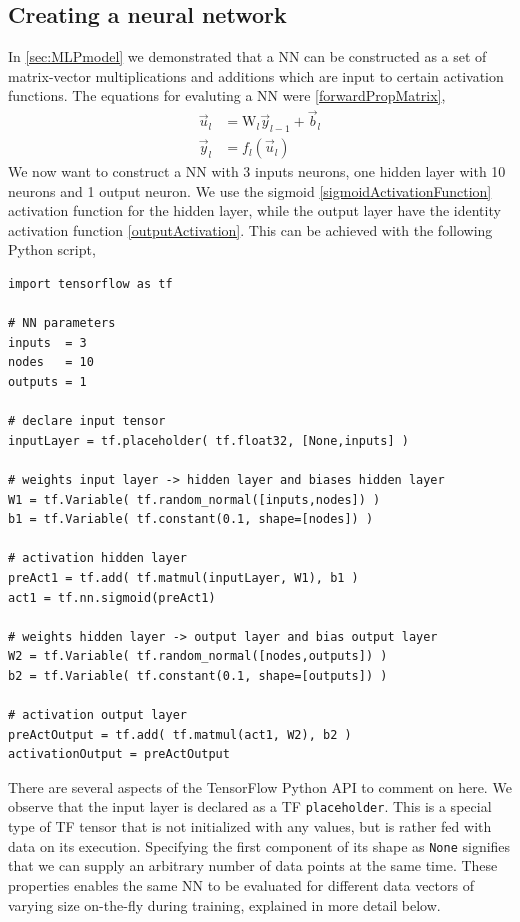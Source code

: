 \documentclass[twoside,english]{uiofysmaster}
\begin{document}
\subsection{Creating a neural network} \label{sec:TensorFlowCreatingNN}
In \autoref{sec:MLPmodel} we demonstrated that a NN can be constructed 
as a set of matrix-vector multiplications and additions which are input to certain activation functions. 
The equations for evaluting a NN were \eqref{forwardPropMatrix},
\begin{equation}
 \begin{aligned}
  \vec{u}_l &= \mathrm{W}_l\vec{y}_{l-1} + \vec{b}_l \\
  \vec{y}_l &= f_l(\vec{u}_l)
  \label{forwardPropMatrix}
 \end{aligned}
\end{equation}
We now want to construct a NN with 3 inputs neurons, one hidden layer with 10 neurons and 1 output neuron. 
We use the sigmoid \eqref{sigmoidActivationFunction} activation function for the hidden layer, while 
the output layer have the identity activation function \eqref{outputActivation}.
This can be achieved with the following Python script,
\begin{verbatim}
import tensorflow as tf

# NN parameters
inputs  = 3
nodes   = 10
outputs = 1

# declare input tensor
inputLayer = tf.placeholder( tf.float32, [None,inputs] )

# weights input layer -> hidden layer and biases hidden layer
W1 = tf.Variable( tf.random_normal([inputs,nodes]) )
b1 = tf.Variable( tf.constant(0.1, shape=[nodes]) )

# activation hidden layer
preAct1 = tf.add( tf.matmul(inputLayer, W1), b1 ) 
act1 = tf.nn.sigmoid(preAct1)

# weights hidden layer -> output layer and bias output layer
W2 = tf.Variable( tf.random_normal([nodes,outputs]) )
b2 = tf.Variable( tf.constant(0.1, shape=[outputs]) )

# activation output layer
preActOutput = tf.add( tf.matmul(act1, W2), b2 ) 
activationOutput = preActOutput
\end{verbatim}
There are several aspects of the TensorFlow Python API to comment on here. 
We observe that the input layer is declared as a TF \texttt{placeholder}. This is a special
type of TF tensor that is not initialized with any values, but is rather fed with data on its execution.
Specifying the first component of its shape as \texttt{None} signifies that we can supply an arbitrary 
number of data points at the same time.
These properties enables the same NN to be evaluated for different data vectors of varying size on-the-fly during training, 
explained in more detail below. 
\end{document}
